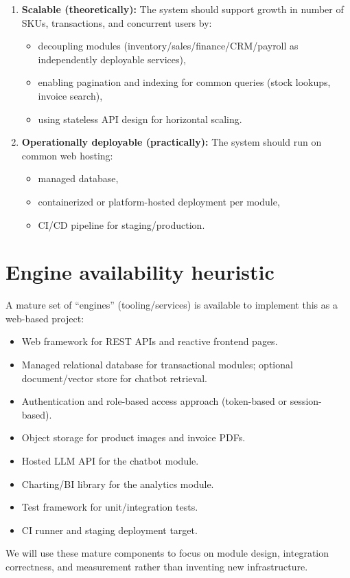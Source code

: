 \documentclass[11pt,a4paper]{article}
\begin{document}
\begin{enumerate}[leftmargin=0.7cm]
    \item \textbf{Scalable (theoretically):} The system should support growth in number of SKUs, transactions, and concurrent users by:
    \begin{itemize}[leftmargin=0.7cm]
        \item decoupling modules (inventory/sales/finance/CRM/payroll as independently deployable services),
        \item enabling pagination and indexing for common queries (stock lookups, invoice search),
        \item using stateless API design for horizontal scaling.
    \end{itemize}
    
    \item \textbf{Operationally deployable (practically):} The system should run on common web hosting:
    \begin{itemize}[leftmargin=0.7cm]
        \item managed database,
        \item containerized or platform-hosted deployment per module,
        \item CI/CD pipeline for staging/production.
    \end{itemize}
\end{enumerate}

\section{Engine availability heuristic}
A mature set of ``engines'' (tooling/services) is available to implement this as a web-based project:
\begin{itemize}[leftmargin=0.7cm]
    \item Web framework for REST APIs and reactive frontend pages.
    \item Managed relational database for transactional modules; optional document/vector store for chatbot retrieval.
    \item Authentication and role-based access approach (token-based or session-based).
    \item Object storage for product images and invoice PDFs.
    \item Hosted LLM API for the chatbot module.
    \item Charting/BI library for the analytics module.
    \item Test framework for unit/integration tests.
    \item CI runner and staging deployment target.
\end{itemize}
We will use these mature components to focus on module design, integration correctness, and measurement rather than inventing new infrastructure.
\end{document}
